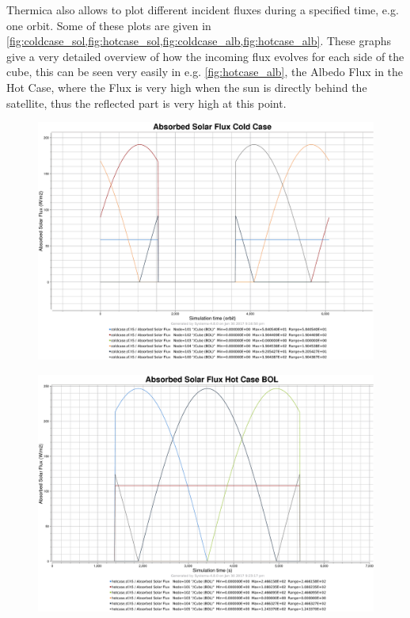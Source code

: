 Thermica also allows to plot different incident fluxes during a specified time, e.g. one orbit. Some of these plots are given in \cref{fig:coldcase_sol,fig:hotcase_sol,fig:coldcase_alb,fig:hotcase_alb}.
These graphs give a very detailed overview of how the incoming flux evolves for each side of the cube, this can be seen very easily in e.g. \cref{fig:hotcase_alb}, the Albedo Flux in the Hot Case, where the Flux is very high when the sun is directly behind the satellite, thus the reflected part is very high at this point.



\begin{figure}[h!]
\centering
  \centering
  \includegraphics[width=0.7\linewidth]{images/Solar_flux_coldcase_BOL}
  \label{fig:coldcase_sol}
\end{figure}
\begin{figure}[h!]
  \centering
  \includegraphics[width=0.7\linewidth]{images/Solar_flux_hotcase_BOL}
  \label{fig:hotcase_sol}
\end{figure}

